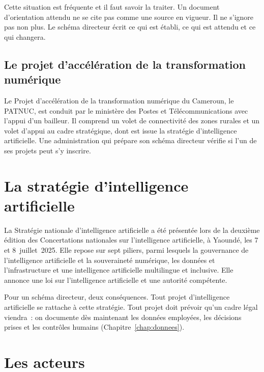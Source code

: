 Cette situation est fréquente et il faut savoir la traiter. Un document d'orientation attendu ne se cite pas
comme une source en vigueur. Il ne s'ignore pas non plus. Le schéma directeur écrit ce qui est établi, ce qui est
attendu et ce qui changera.

\subsection{Le projet d'accélération de la transformation numérique}

Le Projet d'accélération de la transformation numérique du Cameroun, le PATNUC, est conduit par le ministère des
Postes et Télécommunications avec l'appui d'un bailleur. Il comprend un volet de connectivité des zones rurales
et un volet d'appui au cadre stratégique, dont est issue la stratégie d'intelligence artificielle. Une
administration qui prépare son schéma directeur vérifie si l'un de ses projets peut s'y inscrire.

\section{La stratégie d'intelligence artificielle}
\label{sec:c06-ia}

La Stratégie nationale d'intelligence artificielle a été présentée lors de la deuxième édition des Concertations
nationales sur l'intelligence artificielle, à Yaoundé, les 7 et 8~juillet~2025. Elle repose sur sept piliers,
parmi lesquels la gouvernance de l'intelligence artificielle et la souveraineté numérique, les données et
l'infrastructure et une intelligence artificielle multilingue et inclusive. Elle annonce une loi sur
l'intelligence artificielle et une autorité compétente.

Pour un schéma directeur, deux conséquences. Tout projet d'intelligence artificielle se rattache à cette
stratégie. Tout projet doit prévoir qu'un cadre légal viendra~: on documente dès maintenant les données
employées, les décisions prises et les contrôles humains (Chapitre~\ref{chap:donnees}).

\section{Les acteurs}
\label{sec:c06-acteurs}

